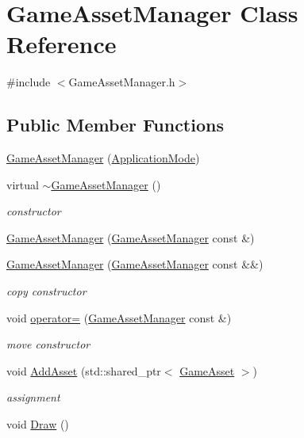 \hypertarget{classGameAssetManager}{}\section{Game\+Asset\+Manager Class Reference}
\label{classGameAssetManager}


{\ttfamily \#include $<$Game\+Asset\+Manager.\+h$>$}

\subsection*{Public Member Functions}
\begin{DoxyCompactItemize}
\item 
\hyperlink{classGameAssetManager_aaa0d58e276cc10ad91a7457085598a71}{Game\+Asset\+Manager} (\hyperlink{common_8h_add86e7c88dd109abea3f708b422f31f0}{Application\+Mode})
\item 
virtual \hyperlink{classGameAssetManager_a1270bd61ecbcca563f079803e40c9b77}{$\sim$\+Game\+Asset\+Manager} ()
\begin{DoxyCompactList}\small\item\em constructor \end{DoxyCompactList}\item 
\hyperlink{classGameAssetManager_a2c9adcb72faa154c87eadc9bafe5269d}{Game\+Asset\+Manager} (\hyperlink{classGameAssetManager}{Game\+Asset\+Manager} const \&)
\item 
\hyperlink{classGameAssetManager_a44f6e2fd6b8ff1dd64e5697f1be7386d}{Game\+Asset\+Manager} (\hyperlink{classGameAssetManager}{Game\+Asset\+Manager} const \&\&)
\begin{DoxyCompactList}\small\item\em copy constructor \end{DoxyCompactList}\item 
void \hyperlink{classGameAssetManager_ac72678a4ad5378c685aa6bae84a4e712}{operator=} (\hyperlink{classGameAssetManager}{Game\+Asset\+Manager} const \&)
\begin{DoxyCompactList}\small\item\em move constructor \end{DoxyCompactList}\item 
void \hyperlink{classGameAssetManager_ad3de8ff00d55ba04728b1de8213b2349}{Add\+Asset} (std\+::shared\+\_\+ptr$<$ \hyperlink{classGameAsset}{Game\+Asset} $>$)
\begin{DoxyCompactList}\small\item\em assignment \end{DoxyCompactList}\item 
void \hyperlink{classGameAssetManager_a32837132bd70a9a9ed537323c2d3d886}{Draw} ()
\end{DoxyCompactItemize}


